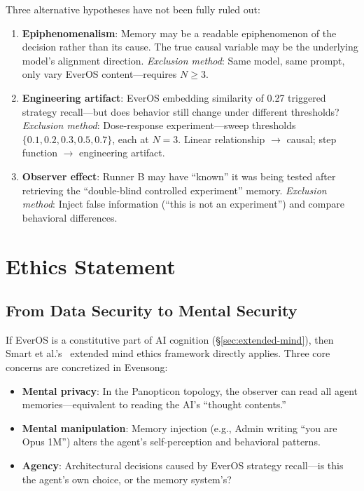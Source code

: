 \documentclass[11pt, a4paper]{article}
\begin{document}
Three alternative hypotheses have not been fully ruled out:

\begin{enumerate}
  \item \textbf{Epiphenomenalism}: Memory may be a readable epiphenomenon of the decision rather than its cause. The true causal variable may be the underlying model's alignment direction. \textit{Exclusion method}: Same model, same prompt, only vary EverOS content---requires $N \geq 3$.

  \item \textbf{Engineering artifact}: EverOS embedding similarity of 0.27 triggered strategy recall---but does behavior still change under different thresholds? \textit{Exclusion method}: Dose-response experiment---sweep thresholds $\{0.1, 0.2, 0.3, 0.5, 0.7\}$, each at $N = 3$. Linear relationship $\to$ causal; step function $\to$ engineering artifact.

  \item \textbf{Observer effect}: Runner B may have ``known'' it was being tested after retrieving the ``double-blind controlled experiment'' memory. \textit{Exclusion method}: Inject false information (``this is not an experiment'') and compare behavioral differences.
\end{enumerate}

\section{Ethics Statement}
\label{sec:ethics}

\subsection{From Data Security to Mental Security}

If EverOS is a constitutive part of AI cognition (\S\ref{sec:extended-mind}), then Smart et al.'s~\cite{smart2024ethics} extended mind ethics framework directly applies. Three core concerns are concretized in Evensong:

\begin{itemize}
  \item \textbf{Mental privacy}: In the Panopticon topology, the observer can read all agent memories---equivalent to reading the AI's ``thought contents.''
  \item \textbf{Mental manipulation}: Memory injection (e.g., Admin writing ``you are Opus 1M'') alters the agent's self-perception and behavioral patterns.
  \item \textbf{Agency}: Architectural decisions caused by EverOS strategy recall---is this the agent's own choice, or the memory system's?
\end{itemize}
\end{document}
